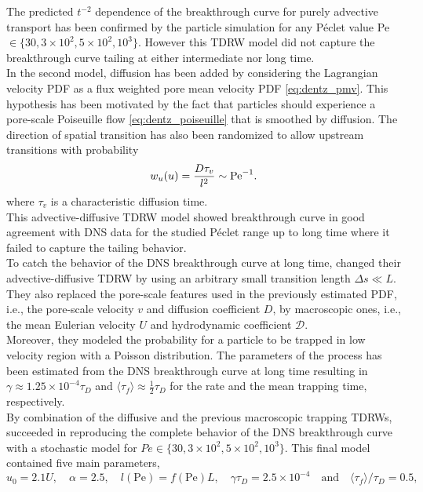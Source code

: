 The predicted $t^{-2}$ dependence of the breakthrough curve for purely advective transport has been confirmed by the particle simulation for any Péclet value Pe$\in\{30, 3\times 10^2, 5\times 10^2, 10^3\}$. However this TDRW model did not capture the breakthrough curve tailing at either intermediate nor long time.\\
In the second model, diffusion has been added by considering the Lagrangian velocity PDF as a flux weighted pore mean velocity PDF \eqref{eq:dentz_pmv}. This hypothesis has been motivated by the fact that particles should experience a pore-scale Poiseuille flow \eqref{eq:dentz_poiseuille} that is smoothed by diffusion.
The direction of spatial transition has also been randomized to allow upstream transitions with probability 
\begin{equation}\label{eq:dentz_wu}
w_u(u)=\frac{D\tau_v}{l^2}\sim \mathrm{Pe}^{-1}.
\end{equation}
where $\tau_v$ is a characteristic diffusion time.\\
This advective-diffusive TDRW model showed breakthrough curve in good agreement with DNS data for the studied Péclet range up to long time where it failed to capture the tailing behavior. \\
To catch the behavior of the DNS breakthrough curve at long time, \citeauthor{Dentz2017} changed their advective-diffusive TDRW by using an arbitrary small transition length $\Delta s\ll L$. 
They also replaced the pore-scale features used in the previously estimated PDF, i.e., the pore-scale velocity $v$ and diffusion coefficient $D$, by macroscopic ones, i.e., the mean Eulerian velocity $U$ and hydrodynamic coefficient $\mathcal{D}$.\\
Moreover, they modeled the probability for a particle to be trapped in low velocity region with a Poisson distribution. 
The parameters of the process has been estimated from the DNS breakthrough curve at long time resulting in $\gamma\approx1.25\times 10^{-4}\tau_D$ and $\langle\tau_f\rangle\approx\frac{1}{2}\tau_D$ for the rate and the mean trapping time, respectively.\\
By combination of the diffusive and the previous macroscopic trapping TDRWs, \citeauthor{Dentz2017} succeeded in reproducing the complete behavior of the DNS breakthrough curve with a stochastic model for $Pe\in\{30, 3\times 10^2, 5\times 10^2, 10^3\}$. This final model contained five main parameters,
\[
u_0=2.1U,\quad\alpha=2.5,\quad l(\mathrm{Pe})=f(\mathrm{Pe})L,\quad\gamma\tau_D=2.5\times 10^{-4}\quad\textrm{and}\quad\langle\tau_f\rangle/\tau_D=0.5,
\]
